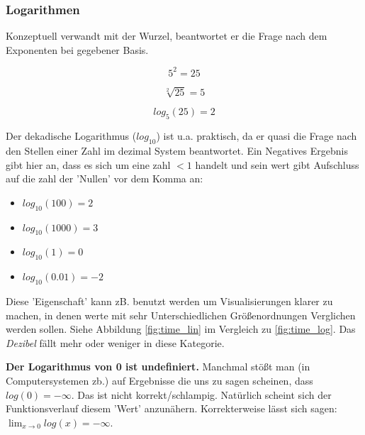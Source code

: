 \subsubsection{Logarithmen}
Konzeptuell verwandt mit der Wurzel, beantwortet er die Frage nach dem Exponenten bei gegebener Basis.

$$ 5 ^2 =25 $$

$$\sqrt[2]{25} = 5$$

$$ log_5 (25) = 2$$




Der dekadische Logarithmus ($log_{10}$) ist u.a. praktisch, da er quasi die Frage nach den Stellen einer Zahl im dezimal System beantwortet. Ein Negatives Ergebnis gibt hier an, dass es sich um eine zahl $<1$ handelt und sein wert gibt Aufschluss auf die zahl der 'Nullen' vor dem Komma an:

\begin{itemize}
    

\item  $ log_{10}(100) = 2$
\item  $ log_{10}(1000) = 3$
\item  $ log_{10}(1) = 0$
\item  $ log_{10}(0.01) = -2$
\end{itemize}

Diese 'Eigenschaft' kann zB. benutzt werden um Visualisierungen klarer zu machen, in denen werte mit sehr Unterschiedlichen Größenordnungen Verglichen werden sollen. Siehe Abbildung \ref{fig:time_lin} im Vergleich zu \ref{fig:time_log}. Das \emph{Dezibel} fällt mehr oder weniger in diese Kategorie. 

\textbf{Der Logarithmus von 0 ist undefiniert.} Manchmal stößt man (in Computersystemen zb.) auf Ergebnisse die uns zu sagen scheinen, dass  $log(0)=-\infty$. Das ist nicht korrekt/schlampig. Natürlich scheint sich der Funktionsverlauf diesem 'Wert' anzunähern. Korrekterweise lässt sich sagen: $\lim_{x\to 0} log(x)=-\infty$. 


